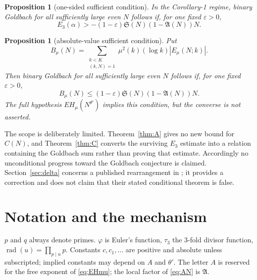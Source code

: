 \documentclass[11pt,a4paper]{article}
\theoremstyle{plain}
\newtheorem{proposition}[theorem]{Proposition}
\theoremstyle{definition}
\theoremstyle{remark}
\renewcommand{\SS}{\mathfrak{S}}
\newcommand{\AAA}{\mathfrak{A}}
\newcommand{\Emu}{E_\mu}
\DeclareMathOperator{\rad}{rad}
\begin{document}
\begin{proposition}[one-sided sufficient condition]\label{prop:onesided}
In the Corollary-1 regime, binary Goldbach for all sufficiently large even
$N$ follows if, for one fixed $\varepsilon>0$,
\begin{equation}\label{eq:onesided}
 E_3(\alpha)>-(1-\varepsilon)\SS(N)(1-\AAA(N))N.
\end{equation}
\end{proposition}

\begin{proposition}[absolute-value sufficient condition]\label{prop:nolog}
Put
\begin{equation}\label{eq:Bsum}
 B_\mu(N)=\sum_{\substack{k<K\\(k,N)=1}}
 \mu^2(k)(\log k)|\Emu(N;k)|.
\end{equation}
Then binary Goldbach for all sufficiently large even $N$ follows if, for
one fixed $\varepsilon>0$,
\begin{equation}\label{eq:nolog}
 B_\mu(N)\le(1-\varepsilon)\SS(N)(1-\AAA(N))N.
\end{equation}
The full hypothesis $EH_\mu(N^{\theta'})$ implies this condition, but
the converse is not asserted.
\end{proposition}

The scope is deliberately limited.  Theorem~\ref{thm:A} gives no new
bound for $C(N)$, and Theorem~\ref{thm:C} converts the surviving
$E_3$ estimate into a relation containing the Goldbach sum rather than
proving that estimate.  Accordingly no unconditional progress toward the
Goldbach conjecture is claimed.  Section~\ref{sec:delta} concerns a
published rearrangement in \cite{HL}; it provides a correction and does
not claim that their stated conditional theorem is false.

\section{Notation and the mechanism}\label{sec:mechanism}

$p$ and $q$ always denote primes. $\varphi$ is Euler's function,
$\tau_3$ the $3$-fold divisor function, $\rad(u)=\prod_{p\mid u}p$.
Constants $c,c_1,\dots$ are positive and absolute unless subscripted;
implied constants may depend on $A$ and $\theta'$. The letter $A$ is
reserved for the free exponent of \eqref{eq:EHmu}; the local factor of
\eqref{eq:AN} is $\AAA$.
\end{document}
